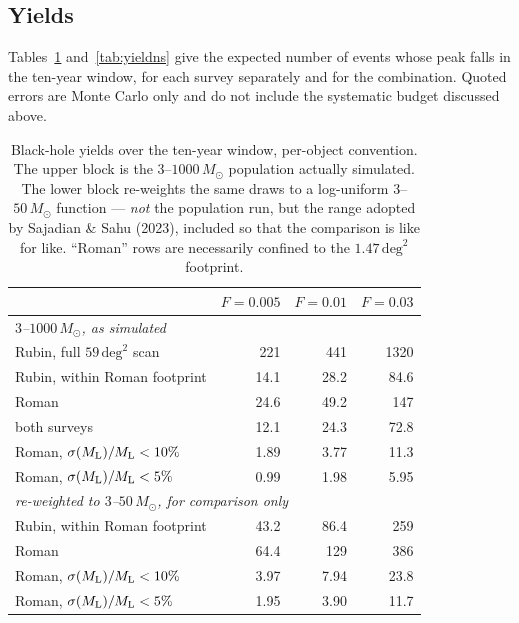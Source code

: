 \documentclass[english,10pt,a4paper]{article}
\newcommand{\Ml}{M_{\rm L}}
\newcommand{\Msun}{M_\odot}
\begin{document}
\subsection{Yields}

Tables~\ref{tab:yieldbh} and~\ref{tab:yieldns} give the expected number of events whose peak falls
in the ten-year window, for each survey separately and for the combination. Quoted errors are
Monte Carlo only and do not include the systematic budget discussed above.

\begin{table}[h]
\centering
\caption{Black-hole yields over the ten-year window, per-object convention. The upper block is the
$3$--$1000\,\Msun$ population actually simulated. The lower block re-weights the same draws to a
log-uniform $3$--$50\,\Msun$ function --- \emph{not} the population run, but the range adopted by
Sajadian \& Sahu (2023), included so that the comparison is like for like. ``Roman'' rows are
necessarily confined to the $1.47\,\mathrm{deg}^2$ footprint.}
\label{tab:yieldbh}
\begin{tabular}{lrrr}
\toprule
 & $F=0.005$ & $F=0.01$ & $F=0.03$ \\
\midrule
\multicolumn{4}{l}{\emph{$3$--$1000\,\Msun$, as simulated}}\\
Rubin, full $59\,\mathrm{deg}^2$ scan  & 221   & 441   & 1320 \\
Rubin, within Roman footprint          & 14.1  & 28.2  & 84.6 \\
Roman                                  & 24.6  & 49.2  & 147  \\
both surveys                           & 12.1  & 24.3  & 72.8 \\
Roman, $\sigma(\Ml)/\Ml<10\%$          & 1.89  & 3.77  & 11.3 \\
Roman, $\sigma(\Ml)/\Ml<5\%$           & 0.99  & 1.98  & 5.95 \\
\midrule
\multicolumn{4}{l}{\emph{re-weighted to $3$--$50\,\Msun$, for comparison only}}\\
Rubin, within Roman footprint          & 43.2  & 86.4  & 259  \\
Roman                                  & 64.4  & 129   & 386  \\
Roman, $\sigma(\Ml)/\Ml<10\%$          & 3.97  & 7.94  & 23.8 \\
Roman, $\sigma(\Ml)/\Ml<5\%$           & 1.95  & 3.90  & 11.7 \\
\bottomrule
\end{tabular}
\end{table}
\end{document}
